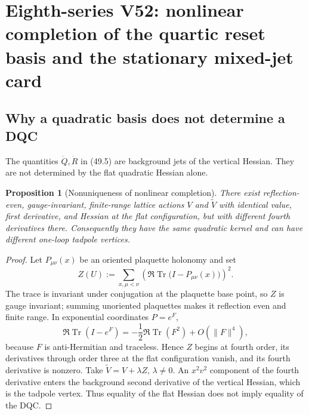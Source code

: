 \documentclass[11pt,oneside]{book}
\newtheorem{proposition}[theorem]{Proposition}
\theoremstyle{definition}
\theoremstyle{remark}
\newcommand{\Tr}{\operatorname{Tr}}
\begin{document}


\section{Eighth-series V52: nonlinear completion of the quartic
reset basis and the stationary mixed-jet card}
\label{sec:e8v52}

\subsection{Why a quadratic basis does not determine a DQC}

The quantities \(\dot Q,\dot R\) in (49.5) are background jets of
the vertical Hessian.  They are not determined by the flat
quadratic Hessian alone.

\begin{proposition}[Nonuniqueness of nonlinear completion]
\label{prop:e8v52-nonlinear-nonuniqueness}
There exist reflection-even, gauge-invariant, finite-range lattice
actions \(V\) and \(\widetilde V\) with identical value, first
derivative, and Hessian at the flat configuration, but with
different fourth derivatives there.  Consequently they have the
same quadratic kernel and can have different one-loop tadpole
vertices.
\end{proposition}

\begin{proof}
Let \(P_{\mu\nu}(x)\) be an oriented plaquette holonomy and set
\[
 Z(U):=\sum_{x,\mu<\nu}
 \left(\Re\Tr\bigl(I-P_{\mu\nu}(x)\bigr)\right)^2.             \tag{52.1}
\]
The trace is invariant under conjugation at the plaquette base
point, so \(Z\) is gauge invariant; summing unoriented plaquettes
makes it reflection even and finite range.  In exponential
coordinates \(P=e^F\),
\[
 \Re\Tr(I-e^F)=-\frac12\Re\Tr(F^2)+O(\|F\|^4),                \tag{52.2}
\]
because \(F\) is anti-Hermitian and traceless.  Hence \(Z\) begins
at fourth order, its derivatives through order three at the flat
configuration vanish, and its fourth derivative is nonzero.
Take \(\widetilde V=V+\lambda Z\), \(\lambda\ne0\).
An \(x^2v^2\) component of the fourth derivative enters the
background second derivative of the vertical Hessian, which is the
tadpole vertex.  Thus equality of the flat Hessian does not imply
equality of the DQC.
\end{proof}
\end{document}
